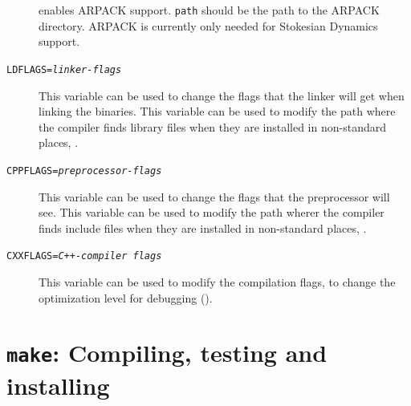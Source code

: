 \begin{description}
  enables ARPACK support. \texttt{path} should be the path to the ARPACK
  directory. ARPACK is currently only needed for Stokesian Dynamics support.
\item[\texttt{LDFLAGS=\textit{linker-flags}}] This variable can be
  used to change the flags that the linker will get when linking the
  \es binaries.  This variable can be used to modify the path where
  the compiler finds library files when they are installed in
  non-standard places, \eg {}.
\item[\texttt{CPPFLAGS=\textit{preprocessor-flags}}] This variable can
  be used to change the flags that the preprocessor will see.  This
  variable can be used to modify the path wherer the compiler finds
  include files when they are installed in non-standard places, \eg
  .
\item[\texttt{CXXFLAGS=\textit{C++-compiler flags}}] This variable can
  be used to modify the compilation flags, \eg to change the
  optimization level for debugging ().
\end{description}


\section{\texttt{make}: Compiling,  testing and installing \es}
\label{sec:make}


